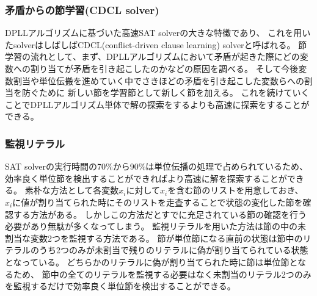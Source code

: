 \documentclass[titlepage]{jsarticle}
\begin{document}
\subsubsection{矛盾からの節学習(CDCL solver)}
DPLLアルゴリズムに基づいた高速SAT solverの大きな特徴であり、
これを用いたsolverはしばしばCDCL(conflict-driven clause learning) solverと呼ばれる。
節学習の流れとして、まず、DPLLアルゴリズムにおいて矛盾が起きた際にどの変数への割り当てが矛盾を引き起こしたのかなどの原因を調べる。
そして今後変数割当や単位伝搬を進めていく中でさきほどの矛盾を引き起こした変数らへの割当を防ぐために
新しい節を学習節として新しく節を加える。
これを続けていくことでDPLLアルゴリズム単体で解の探索をするよりも高速に探索をすることができる。



\subsubsection{監視リテラル}
SAT solverの実行時間の70\%から90\%は単位伝播の処理で占められているため、効率良く単位節を検出することができればより高速に解を探索することができる。
素朴な方法として各変数$x_i$に対して$x_i$を含む節のリストを用意しておき、
$x_i$に値が割り当てられた時にそのリストを走査することで状態の変化した節を確認する方法がある。
しかしこの方法だとすでに充足されている節の確認を行う必要があり無駄が多くなってしまう。
監視リテラルを用いた方法は節の中の未割当な変数2つを監視する方法である。
節が単位節になる直前の状態は節中のリテラルのうち2つのみが未割当で残りのリテラルに偽が割り当てられている状態となっている。
どちらかのリテラルに偽が割り当てられた時に節は単位節となるため、
節中の全てのリテラルを監視する必要はなく未割当のリテラル2つのみを監視するだけで効率良く単位節を検出することができる。
\end{document}
